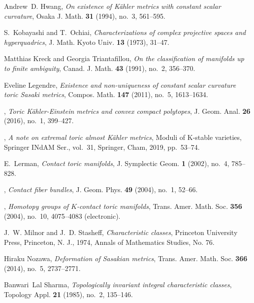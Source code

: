 \documentclass[12pt]{amsart}
\begin{document}
\begin{thebibliography}{ACGTF08}
Andrew~D. Hwang, \emph{On existence of {K}\"ahler metrics with constant scalar
  curvature}, Osaka J. Math. \textbf{31} (1994), no.~3, 561--595. 

S.~Kobayashi and T.~Ochiai, \emph{Characterizations of complex projective
  spaces and hyperquadrics}, J. Math. Kyoto Univ. \textbf{13} (1973), 31--47.

Matthias Kreck and Georgia Triantafillou, \emph{On the classification of
  manifolds up to finite ambiguity}, Canad. J. Math. \textbf{43} (1991), no.~2,
  356--370. 

Eveline Legendre, \emph{Existence and non-uniqueness of constant scalar
  curvature toric {S}asaki metrics}, Compos. Math. \textbf{147} (2011), no.~5,
  1613--1634. 

\bysame, \emph{Toric {K}\"ahler-{E}instein metrics and convex compact
  polytopes}, J. Geom. Anal. \textbf{26} (2016), no.~1, 399--427. 

\bysame, \emph{A note on extremal toric almost {K}\"{a}hler metrics}, Moduli of
  {K}-stable varieties, Springer INdAM Ser., vol.~31, Springer, Cham, 2019,
  pp.~53--74. 

E.~Lerman, \emph{Contact toric manifolds}, J. Symplectic Geom. \textbf{1}
  (2002), no.~4, 785--828. 

\bysame, \emph{Contact fiber bundles}, J. Geom. Phys. \textbf{49} (2004),
  no.~1, 52--66. 

\bysame, \emph{Homotopy groups of {$K$}-contact toric manifolds}, Trans. Amer.
  Math. Soc. \textbf{356} (2004), no.~10, 4075--4083 (electronic). 

J.~W. Milnor and J.~D. Stasheff, \emph{Characteristic classes}, Princeton
  University Press, Princeton, N. J., 1974, Annals of Mathematics Studies, No.
  76. 

Hiraku Nozawa, \emph{Deformation of {S}asakian metrics}, Trans. Amer. Math.
  Soc. \textbf{366} (2014), no.~5, 2737--2771. 

Banwari~Lal Sharma, \emph{Topologically invariant integral characteristic
  classes}, Topology Appl. \textbf{21} (1985), no.~2, 135--146. 


\end{thebibliography}
\end{document}
